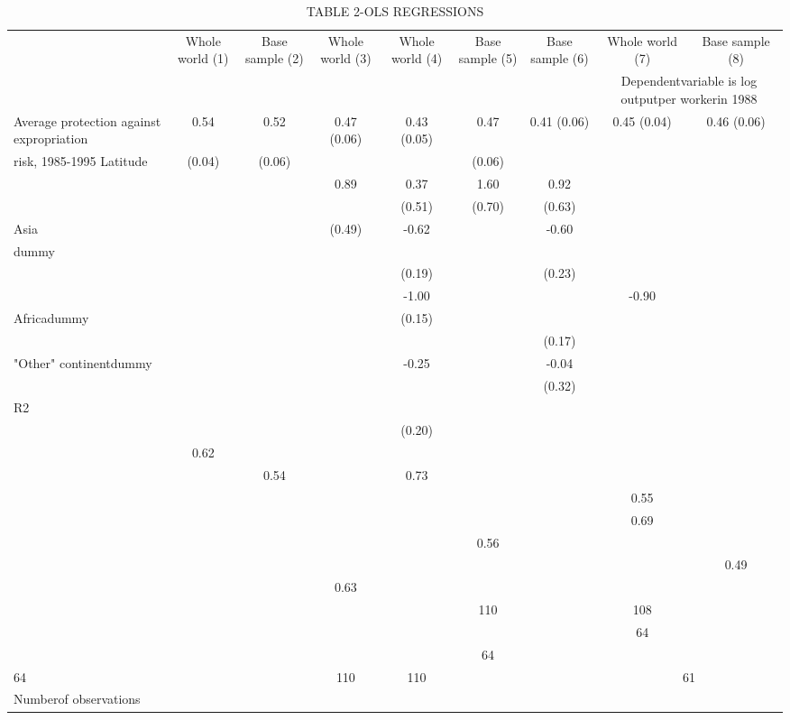 \begin{table}[htbp]
\centering
\caption{TABLE  2-OLS REGRESSIONS}
\begin{tabular}{lcccccccccc}
\hline
 & Whole world (1) & Base sample (2) & Whole world (3) & Whole world (4) & Base sample (5) & Base sample (6) & Whole world (7) & \multicolumn{3}{c}{Base sample (8)} \\
 &  &  &  &  &  &  & \multicolumn{4}{c}{Dependentvariable is log outputper workerin 1988} \\
Average protection against expropriation & 0.54 & 0.52 & 0.47 (0.06) & 0.43 (0.05) & 0.47 & 0.41 (0.06) & 0.45 (0.04) & \multicolumn{3}{c}{0.46 (0.06)} \\
risk, 1985-1995 Latitude & (0.04) & (0.06) &  &  & (0.06) &  &  &  &  &  \\
 &  &  & 0.89 & 0.37 & 1.60 & 0.92 &  &  &  &  \\
 &  &  &  & (0.51) & (0.70) & (0.63) &  &  &  &  \\
Asia &  &  & (0.49) & -0.62 &  & -0.60 &  &  &  &  \\
dummy &  &  &  &  &  &  &  &  &  &  \\
 &  &  &  & (0.19) &  & (0.23) &  &  &  &  \\
 &  &  &  & -1.00 &  &  & -0.90 &  &  &  \\
Africadummy &  &  &  & (0.15) &  &  &  &  &  &  \\
 &  &  &  &  &  & (0.17) &  &  &  &  \\
"Other" continentdummy &  &  &  & -0.25 &  & -0.04 &  &  &  &  \\
 &  &  &  &  &  & (0.32) &  &  &  &  \\
R2 &  &  &  &  &  &  &  &  &  &  \\
 &  &  &  & (0.20) &  &  &  &  &  &  \\
 & 0.62 &  &  &  &  &  &  &  &  &  \\
 &  & 0.54 &  & 0.73 &  &  &  &  &  &  \\
 &  &  &  &  &  &  & 0.55 &  &  &  \\
 &  &  &  &  &  &  & 0.69 &  &  &  \\
 &  &  &  &  & 0.56 &  &  &  &  &  \\
 &  &  &  &  &  &  &  & \multicolumn{3}{c}{0.49} \\
 &  &  & 0.63 &  &  &  &  &  &  &  \\
 &  &  &  &  & 110 &  & 108 &  &  &  \\
 &  &  &  &  &  &  & 64 &  &  &  \\
 &  &  &  &  & 64 &  &  &  &  &  \\
64 &  &  & 110 & 110 &  &  & \multicolumn{4}{c}{61} \\
Numberof observations &  &  &  &  &  &  &  &  &  &  \\
\hline
\end{tabular}
\end{table}
